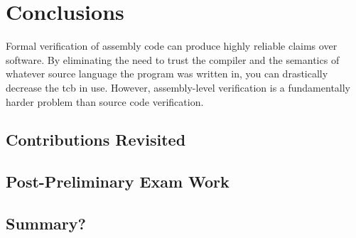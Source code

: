 \chapter{Conclusions}\label{ch:conclusions}
Formal verification of assembly code can produce highly reliable claims over software.
By eliminating the need to trust the compiler
and the semantics of whatever source language the program was written in,
you can drastically decrease the \ac{tcb} in use.
However, assembly-level verification is a fundamentally harder problem
than source code verification.

\section{Contributions Revisited}

\section{Post-Preliminary Exam Work}
\section{Summary?}
